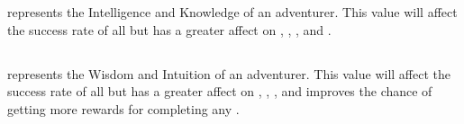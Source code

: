  represents the Intelligence and Knowledge of an adventurer. This value will affect the success rate of all  but has a greater affect on , , , and .

\subsection{}

 represents the Wisdom and Intuition of an adventurer. This value will affect the success rate of all  but has a greater affect on , , , and improves the chance of getting more rewards for completing any .




\section{}

\subsection{}

\subsection{}

\subsection{}
